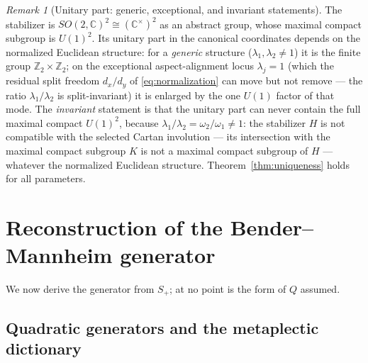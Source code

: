 \documentclass[11pt]{article}
\theoremstyle{definition}
\theoremstyle{remark}
\newtheorem{remark}[theorem]{Remark}
\newcommand{\C}{\mathbb{C}}
\newcommand{\Z}{\mathbb{Z}}
\newcommand{\w}{\omega}
\begin{document}
\begin{remark}[Unitary part: generic, exceptional, and invariant statements]
\label{rem:unitarypart}
The stabilizer is $SO(2,\C)^2\cong(\C^{\times})^2$ as an abstract group,
whose maximal compact subgroup is $U(1)^2$.  Its unitary part in the
canonical coordinates depends on the normalized Euclidean structure:
for a \emph{generic} structure ($\lambda_1,\lambda_2\neq1$) it is the
finite group $\Z_2\times\Z_2$; on the exceptional aspect-alignment locus
$\lambda_j=1$ (which the residual split freedom $d_x/d_y$ of
\eqref{eq:normalization} can move but not remove --- the ratio
$\lambda_1/\lambda_2$ is split-invariant) it is enlarged by the one
$U(1)$ factor of that mode.  The \emph{invariant} statement is that the
unitary part can never contain the full maximal compact $U(1)^2$, because
$\lambda_1/\lambda_2=\w_2/\w_1\neq1$: the stabilizer $H$ is not
compatible with the selected Cartan involution --- its intersection with
the maximal compact subgroup $K$ is not a maximal compact subgroup of $H$
--- whatever the normalized Euclidean structure.
Theorem~\ref{thm:uniqueness} holds for all parameters.
\end{remark}

\section{Reconstruction of the Bender--Mannheim generator}
\label{sec:reconstruction}

We now derive the generator from $S_+$; at no point is the form of $Q$
assumed.

\subsection{Quadratic generators and the metaplectic dictionary}
\end{document}
